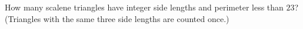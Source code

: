 How many scalene triangles have integer side lengths and perimeter less than $23$? (Triangles with the same three side lengths are counted once.)
